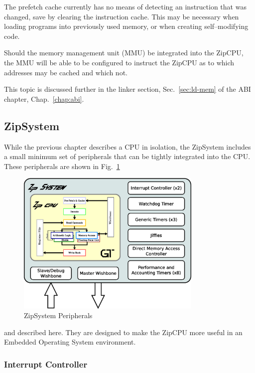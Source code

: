 \documentclass{gqtekspec}
\begin{document}
The prefetch cache currently has no means of detecting an instruction that
was changed, save by clearing the instruction cache.  This may be necessary
when loading programs into previously used memory, or when creating
self--modifying code.

Should the memory management unit (MMU) be integrated into the ZipCPU, the MMU
will be able to be configured to instruct the ZipCPU as to which addresses may
be cached and which not.

This topic is discussed further in the linker section, Sec.~\ref{sec:ld-mem}
of the ABI chapter, Chap.~\ref{chap:abi}.


\subsection{ZipSystem}\label{sec:zipsys}

While the previous chapter describes a CPU in isolation, the ZipSystem
includes a small minimum set of peripherals that can be tightly integrated into
the CPU.  These peripherals are shown in Fig.~\ref{fig:zipsystem}
\begin{figure}\begin{center}
\includegraphics[width=3.5in]{../gfx/system.eps}
\caption{ZipSystem Peripherals}\label{fig:zipsystem}
\end{center}\end{figure}
and described here.  They are designed to make
the ZipCPU more useful in an Embedded Operating System environment.

\subsubsection{Interrupt Controller}\label{sec:pic}
\end{document}
